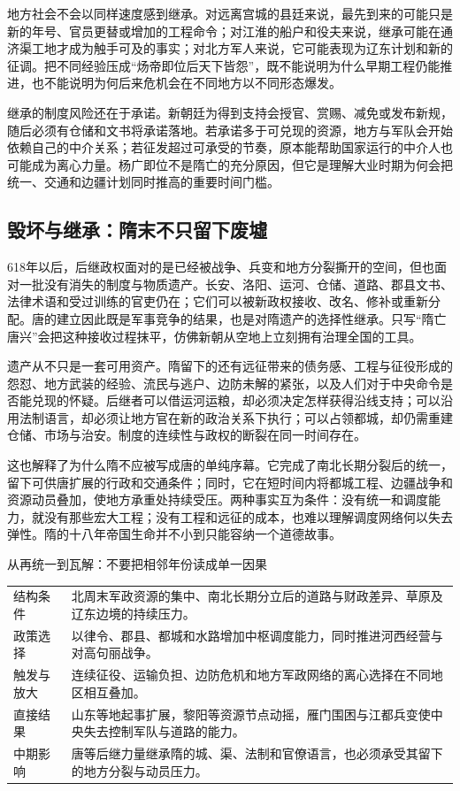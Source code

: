 地方社会不会以同样速度感到继承。对远离宫城的县廷来说，最先到来的可能只是新的年号、官员更替或增加的工程命令；对江淮的船户和役夫来说，继承可能在通济渠工地才成为触手可及的事实；对北方军人来说，它可能表现为辽东计划和新的征调。把不同经验压成“炀帝即位后天下皆怨”，既不能说明为什么早期工程仍能推进，也不能说明为何后来危机会在不同地方以不同形态爆发。

继承的制度风险还在于承诺。新朝廷为得到支持会授官、赏赐、减免或发布新规，随后必须有仓储和文书将承诺落地。若承诺多于可兑现的资源，地方与军队会开始依赖自己的中介关系；若征发超过可承受的节奏，原本能帮助国家运行的中介人也可能成为离心力量。杨广即位不是隋亡的充分原因，但它是理解大业时期为何会把统一、交通和边疆计划同时推高的重要时间门槛。

\subsection{毁坏与继承：隋末不只留下废墟}
618年以后，后继政权面对的是已经被战争、兵变和地方分裂撕开的空间，但也面对一批没有消失的制度与物质遗产。长安、洛阳、运河、仓储、道路、郡县文书、法律术语和受过训练的官吏仍在；它们可以被新政权接收、改名、修补或重新分配。唐的建立因此既是军事竞争的结果，也是对隋遗产的选择性继承。只写“隋亡唐兴”会把这种接收过程抹平，仿佛新朝从空地上立刻拥有治理全国的工具。

遗产从不只是一套可用资产。隋留下的还有远征带来的债务感、工程与征役形成的怨怼、地方武装的经验、流民与逃户、边防未解的紧张，以及人们对于中央命令是否能兑现的怀疑。后继者可以借运河运粮，却必须决定怎样获得沿线支持；可以沿用法制语言，却必须让地方官在新的政治关系下执行；可以占领都城，却仍需重建仓储、市场与治安。制度的连续性与政权的断裂在同一时间存在。

这也解释了为什么隋不应被写成唐的单纯序幕。它完成了南北长期分裂后的统一，留下可供唐扩展的行政和交通条件；同时，它在短时间内将都城工程、边疆战争和资源动员叠加，使地方承重处持续受压。两种事实互为条件：没有统一和调度能力，就没有那些宏大工程；没有工程和远征的成本，也难以理解调度网络何以失去弹性。隋的十八年帝国生命并不小到只能容纳一个道德故事。

\begin{causalchain}{从再统一到瓦解：不要把相邻年份读成单一因果}
\begin{tabular}{p{.23\linewidth}p{.68\linewidth}}
结构条件 & 北周末军政资源的集中、南北长期分立后的道路与财政差异、草原及辽东边境的持续压力。\\
政策选择 & 以律令、郡县、都城和水路增加中枢调度能力，同时推进河西经营与对高句丽战争。\\
触发与放大 & 连续征役、运输负担、边防危机和地方军政网络的离心选择在不同地区相互叠加。\\
直接结果 & 山东等地起事扩展，黎阳等资源节点动摇，雁门围困与江都兵变使中央失去控制军队与道路的能力。\\
中期影响 & 唐等后继力量继承隋的城、渠、法制和官僚语言，也必须承受其留下的地方分裂与动员压力。\\
\end{tabular}
\end{causalchain}

